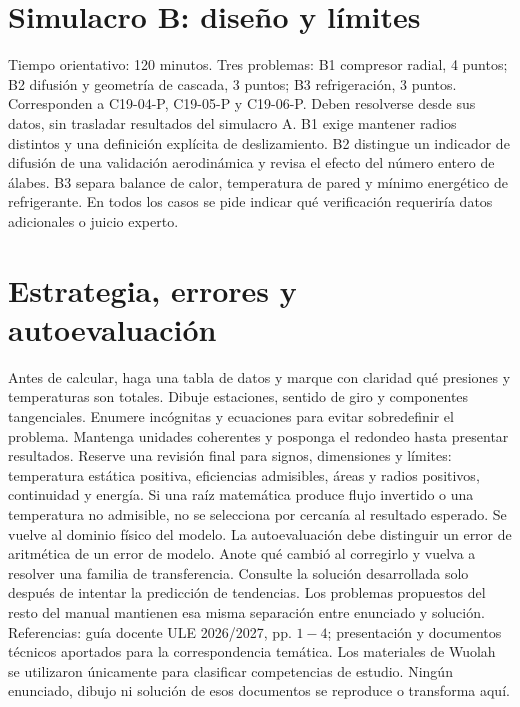 \documentclass[10pt,openany]{book}
\begin{document}
\section{Simulacro B: diseño y límites}

Tiempo orientativo: 120 minutos. Tres problemas: B1 compresor radial, 4 puntos; B2 difusión y geometría de cascada, 3 puntos; B3 refrigeración, 3 puntos. Corresponden a C19-04-P, C19-05-P y C19-06-P. Deben resolverse desde sus datos, sin trasladar resultados del simulacro A.
B1 exige mantener radios distintos y una definición explícita de deslizamiento. B2 distingue un indicador de difusión de una validación aerodinámica y revisa el efecto del número entero de álabes. B3 separa balance de calor, temperatura de pared y mínimo energético de refrigerante. En todos los casos se pide indicar qué verificación requeriría datos adicionales o juicio experto.

\section{Estrategia, errores y autoevaluación}

Antes de calcular, haga una tabla de datos y marque con claridad qué presiones y temperaturas son totales. Dibuje estaciones, sentido de giro y componentes tangenciales. Enumere incógnitas y ecuaciones para evitar sobredefinir el problema. Mantenga unidades coherentes y posponga el redondeo hasta presentar resultados.
Reserve una revisión final para signos, dimensiones y límites: temperatura estática positiva, eficiencias admisibles, áreas y radios positivos, continuidad y energía. Si una raíz matemática produce flujo invertido o una temperatura no admisible, no se selecciona por cercanía al resultado esperado. Se vuelve al dominio físico del modelo.
La autoevaluación debe distinguir un error de aritmética de un error de modelo. Anote qué cambió al corregirlo y vuelva a resolver una familia de transferencia. Consulte la solución desarrollada solo después de intentar la predicción de tendencias. Los problemas propuestos del resto del manual mantienen esa misma separación entre enunciado y solución.
Referencias: guía docente ULE 2026/2027, pp. \(1-4\); presentación y documentos técnicos aportados para la correspondencia temática. Los materiales de Wuolah se utilizaron únicamente para clasificar competencias de estudio. Ningún enunciado, dibujo ni solución de esos documentos se reproduce o transforma aquí.
\end{document}
